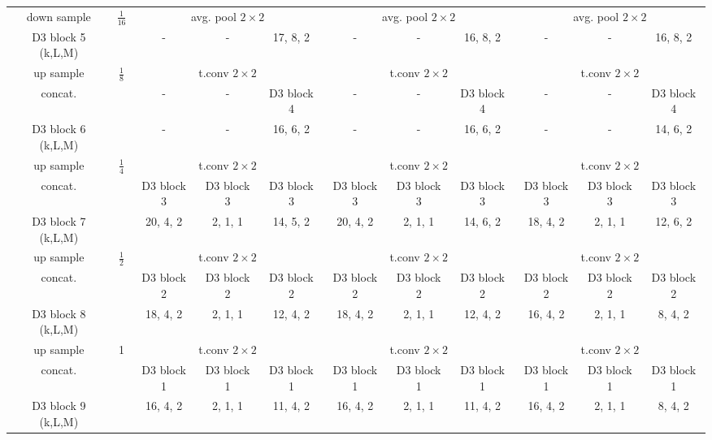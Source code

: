 \documentclass[final]{cvpr}
\begin{document}
\begin{table*}[t]
{\begin{tabular}{ c | c | c | c | c | c | c | c | c | c | c}
        \hline
        down sample  & \multirow{2}{*}{$\frac{1}{16}$} &  \multicolumn{3}{c|}{avg. pool $2\times2$} & \multicolumn{3}{c|}{avg. pool $2\times2$} &  \multicolumn{3}{c}{avg. pool $2\times2$} \\
        \cline{3-11}
        D3 block 5 (k,L,M) & & - & - & 17, 8, 2 &  - & - & 16, 8, 2 & - & - & 16, 8, 2 \\
        \hline
        up sample  & \multirow{3}{*}{$\frac{1}{8}$} & \multicolumn{3}{c|}{t.conv $2\times2$} &  \multicolumn{3}{c|}{t.conv $2\times2$} & \multicolumn{3}{c}{t.conv $2\times2$} \\
        \cline{3-11}
        concat. & & - & - & D3 block 4 & - & - & D3 block 4 & - & - & D3 block 4 \\
        D3 block 6 (k,L,M) & & -& - & 16, 6, 2& -& - & 16, 6, 2& -& - & 14, 6, 2 \\
		\hline
        up sample  & \multirow{3}{*}{$\frac{1}{4}$} & \multicolumn{3}{c|}{t.conv $2\times2$} &  \multicolumn{3}{c|}{t.conv $2\times2$} & \multicolumn{3}{c}{t.conv $2\times2$} \\
        \cline{3-11}
        concat. & & D3 block 3 & D3 block 3 & D3 block 3 & D3 block 3 & D3 block 3 & D3 block 3 & D3 block 3 & D3 block 3 & D3 block 3\\
        D3 block 7 (k,L,M) & & 20, 4, 2& 2, 1, 1 & 14, 5, 2 & 20, 4, 2& 2, 1, 1 & 14, 6, 2 & 18, 4, 2& 2, 1, 1 & 12, 6, 2\\
		\hline
        up sample  & \multirow{3}{*}{$\frac{1}{2}$} & \multicolumn{3}{c|}{t.conv $2\times2$} & \multicolumn{3}{c|}{t.conv $2\times2$}  & \multicolumn{3}{c}{t.conv $2\times2$}\\
        \cline{3-11}
        concat. & & D3 block 2 & D3 block 2 & D3 block 2 & D3 block 2 & D3 block 2 & D3 block 2 & D3 block 2 & D3 block 2 & D3 block 2 \\
        D3 block 8 (k,L,M) & & 18, 4, 2 & 2, 1, 1 & 12, 4, 2  & 18, 4, 2 & 2, 1, 1 & 12, 4, 2 & 16, 4, 2 & 2, 1, 1 & 8, 4, 2\\
		\hline
        up sample  & \multirow{3}{*}{1} & \multicolumn{3}{c|}{t.conv $2\times2$} &  \multicolumn{3}{c|}{t.conv $2\times2$}  & \multicolumn{3}{c}{t.conv $2\times2$} \\
        \cline{3-11}
        concat. & & D3 block 1 & D3 block 1 & D3 block 1 & D3 block 1 & D3 block 1 & D3 block 1 & D3 block 1 & D3 block 1 & D3 block 1\\
        D3 block 9 (k,L,M) & & 16, 4, 2 & 2, 1, 1 & 11, 4, 2  & 16, 4, 2 & 2, 1, 1 & 11, 4, 2 & 16, 4, 2 & 2, 1, 1 & 8, 4, 2\\        

\end{tabular}}
\end{table*}
\end{document}
